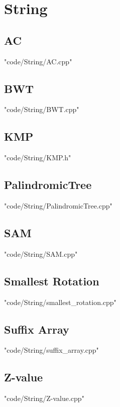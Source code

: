\section{String}
\subsection{AC}
 {"code/String/AC.cpp"}
\subsection{BWT}
 {"code/String/BWT.cpp"}
\subsection{KMP}
 {"code/String/KMP.h"}
\subsection{PalindromicTree}
 {"code/String/PalindromicTree.cpp"}
\subsection{SAM}
 {"code/String/SAM.cpp"}
\subsection{Smallest Rotation}
 {"code/String/smallest_rotation.cpp"}
\subsection{Suffix Array}
 {"code/String/suffix_array.cpp"}
\subsection{Z-value}
 {"code/String/Z-value.cpp"}




